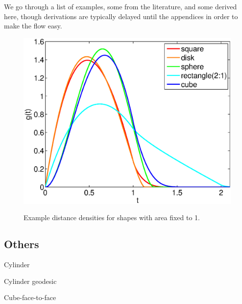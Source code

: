 \documentclass{article}
\begin{document}
We go through a list of examples, some from the literature, and some
derived here, though derivations are typically delayed until the
appendices in order to make the flow easy.

\begin{figure}[htbp]
  \begin{center}
    \includegraphics[width=0.5\columnwidth]{../Matlab/Plots/LinePicking_plot_fix_area.eps}

    \label{fig:various}
    \caption{Example distance densities for shapes with area fixed to 1.}
  \end{center} 
\vspace{-4mm}
\end{figure}


\clearpage


\clearpage


\clearpage


\clearpage


\clearpage


\clearpage


\clearpage


\clearpage


\clearpage


\clearpage


\clearpage


\clearpage


\clearpage
\subsection{Others}

Cylinder

Cylinder geodesic

Cube-face-to-face
\end{document}
